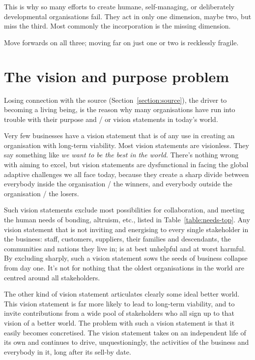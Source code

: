 This is why so many efforts to create humane, self-managing, or deliberately developmental organisations fail. They act in only one dimension, maybe two, but miss the third. Most commonly the incorporation is the missing dimension. 


Move forwards on all three; moving far on just one or two is recklessly fragile.  
 
\section{The vision and purpose problem}
Losing connection with the source (Section~\ref{section:source}), the driver to becoming a living being, is the reason why many organisations have run into trouble with their purpose and / or vision statements in today's world. 


Very few businesses have a vision statement that is of any use in creating an organisation with long-term viability. Most vision statements are visionless. They say something like \emph{we want to be the best in the world.} There's nothing wrong with aiming to excel, but vision statements are dysfunctional in facing the global adaptive challenges we all face today, because they create a sharp divide between everybody inside the organisation / the winners, and everybody outside the organisation / the losers. 


Such vision statements  exclude most possibilities for collaboration, and meeting the human needs of bonding, altruism, etc., listed in Table~\ref{table:needs-top}. Any vision statement that is not inviting and energising to every single stakeholder in the business: staff, customers, suppliers, their families and descendants, the communities and nations they live in; is at best unhelpful and at worst harmful. By excluding sharply, such a vision statement sows the seeds of business collapse from day one. It's not for nothing that the oldest organisations in the world are centred around all stakeholders.


The other kind of vision statement articulates clearly some ideal better world. This vision statement is far more likely to lead to long-term viability, and to invite contributions from a wide pool of stakeholders who all sign up to that vision of a better world. The problem with such a vision statement is that it easily becomes concretised. The vision statement takes on an independent life of its own and continues to drive, unquestioningly, the activities of the business and everybody in it, long after its sell-by date.


